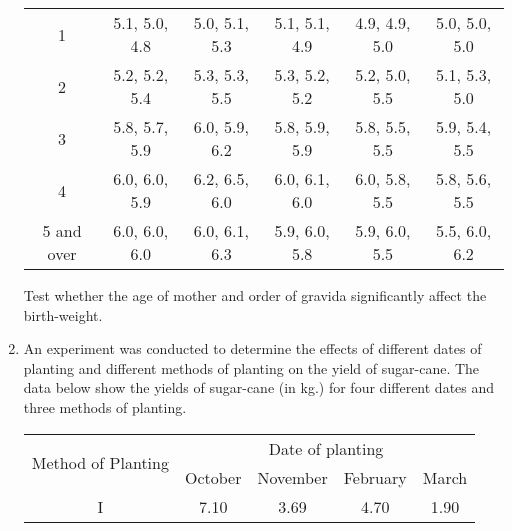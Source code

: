 \documentclass[11pt, a4paper]{article}
\begin{document}
\begin{enumerate}
\begin{table}[h]
\begin{center}
\begin{tabular}{|c|c|c|c|c|c|}
	\hline
	
	1 & 5.1, 5.0, 4.8 & 5.0, 5.1, 5.3 & 5.1, 5.1, 4.9 & 4.9, 4.9, 5.0 & 5.0, 5.0, 5.0 \\
	
	2 & 5.2, 5.2, 5.4 & 5.3, 5.3, 5.5 & 5.3, 5.2, 5.2 & 5.2, 5.0, 5.5 & 5.1, 5.3, 5.0 \\
	
	3 & 5.8, 5.7, 5.9 & 6.0, 5.9, 6.2 & 5.8, 5.9, 5.9 & 5.8, 5.5, 5.5 & 5.9, 5.4, 5.5 \\
	
	4 & 6.0, 6.0, 5.9 & 6.2, 6.5, 6.0 & 6.0, 6.1, 6.0 & 6.0, 5.8, 5.5 & 5.8, 5.6, 5.5 \\
	
	5 and over & 6.0, 6.0, 6.0 & 6.0, 6.1, 6.3 & 5.9, 6.0, 5.8 & 5.9, 6.0, 5.5 & 5.5, 6.0, 6.2 \\
	
	\hline
	
	\end{tabular}
	\end{center}
	
	\end{table}
	
	Test whether the age of mother and order of gravida significantly affect the birth-weight.
	
	
	
	
	
	
	
	
	\item An experiment was conducted to determine the effects of different dates of planting and different methods of planting on the yield of sugar-cane. The data below show the yields of sugar-cane (in kg.) for four different dates and three methods of planting.
	
	\begin{table}[h]
	\def\arraystretch{1.5}
	
	\begin{center}
	\begin{tabular}{|c|c|c|c|c|}
	
	\hline
	
	\multirow{2}{*}{Method of Planting} & \multicolumn{4}{c|}{Date of planting} \\
	
	\hhline{~----}
	
	& October & November & February & March \\
	
	\hline
	
	I & 7.10 & 3.69 & 4.70 & 1.90 \\
	

\end{tabular}
\end{center}
\end{table}
\end{enumerate}
\end{document}
